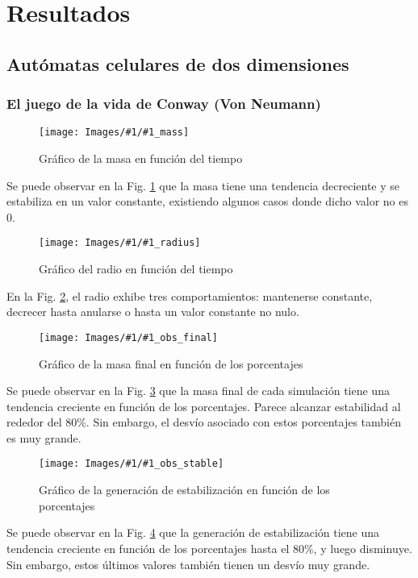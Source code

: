 \newcommand{\massgraph}[1]{
    \begin{figure}[H]
        \centering
        \texttt{[image: Images/\#1/\#1\_mass]}
        \caption{Gráfico de la masa en función del tiempo}
        \label{fig:#1mass}
    \end{figure}
}

\newcommand{\radiusgraph}[1]{
    \begin{figure}[H]
        \centering
        \texttt{[image: Images/\#1/\#1\_radius]}
        \caption{Gráfico del radio en función del tiempo}
        \label{fig:#1radius}
    \end{figure}
}

\newcommand{\obsfinalgraph}[1]{
    \begin{figure}[H]
        \centering
        \texttt{[image: Images/\#1/\#1\_obs\_final]}
        \caption{Gráfico de la masa final en función de los porcentajes}
        \label{fig:#1obsfinal}
    \end{figure}
}

\newcommand{\obsstablegraph}[1]{
    \begin{figure}[H]
        \centering
        \texttt{[image: Images/\#1/\#1\_obs\_stable]}
        \caption{Gráfico de la generación de estabilización en función de los porcentajes}
        \label{fig:#1obsstable}
    \end{figure}
}

\section{Resultados}
\label{sec:resultados}

\subsection{Autómatas celulares de dos dimensiones}
\label{subsec:results2d}
\subsubsection{El juego de la vida de Conway (Von Neumann)}
\massgraph{gol2Dv2}
Se puede observar en la Fig. \ref{fig:gol2Dv2mass} que la masa tiene una tendencia decreciente y se estabiliza en un valor constante, existiendo algunos casos donde dicho valor no es $0$.
\radiusgraph{gol2Dv2}
En la Fig. \ref{fig:gol2Dv2radius}, el radio exhibe tres comportamientos: mantenerse constante, decrecer hasta anularse o hasta un valor constante no nulo.
\obsfinalgraph{gol2Dv2}
Se puede observar en la Fig. \ref{fig:gol2Dv2obsfinal} que la masa final de cada simulación tiene una tendencia creciente en función de los porcentajes. Parece alcanzar estabilidad al rededor del 80\%.
Sin embargo, el desvío asociado con estos porcentajes también es muy grande.
\obsstablegraph{gol2Dv2}
Se puede observar en la Fig. \ref{fig:gol2Dv2obsstable} que la generación de estabilización tiene una tendencia creciente en función de los porcentajes hasta el 80\%, y luego disminuye.
Sin embargo, estos últimos valores también tienen un desvío muy grande.


